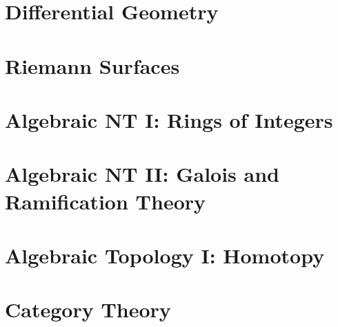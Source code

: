 \documentclass[11pt,a5paper,twoside=semi,openright,numbers=noenddot,titlepage=false]{scrbook}
\begin{document}
\part{Differential Geometry}
\label{part:diffgeo}
\parttoc



\part{Riemann Surfaces}
\label{part:riemann}
\parttoc







\part{Algebraic NT I: Rings of Integers}
\label{part:algnt1}
\parttoc







\part{Algebraic NT II: Galois and Ramification Theory}
\label{part:algnt2}
\parttoc





\part{Algebraic Topology I: Homotopy}
\label{part:algtop1}
\parttoc



\part{Category Theory}
\label{part:cats}
\parttoc


\end{document}

